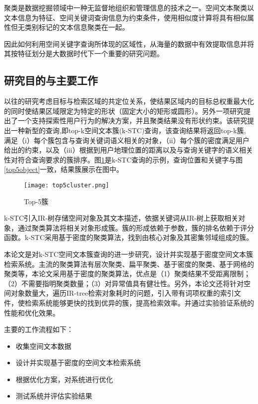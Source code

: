 聚类是数据挖掘领域中一种无监督地组织和管理信息的技术之一。空间文本聚类以文本信息为特征、空间关键词查询信息为约束条件，使用相似度计算将具有相似属性但无类别标记的文本信息聚类在一起。

因此如何利用空间关键字查询所体现的区域性，从海量的数据中有效提取信息并将其按特征划分是大数据时代下一个重要的研究问题。

\subsection{研究目的与主要工作}
以往的研究\cite{DBLP:journals/pvldb/ChoiCT12,DBLP:conf/cikm/LiuYS11,DBLP:journals/pvldb/TaoHCC13}考虑目标与检索区域的共定位关系，使结果区域内的目标总权重最大化的同时使结果区域限定为特定的形状（固定大小的矩形或圆形）。另外一项研究\cite{DBLP:conf/cikm/WuJ16}提出了一个支持探索性用户行为的解决方案，并且聚类结果没有形状约束。该研究提出一种新型的查询,即top-k空间文本簇(k-STC)查询，该查询结果将返回top-k簇, 满足（i）每个簇包含与查询关键词语义相关的对象，（ii）每个簇的密度满足用户给出的约束，以及（iii）根据到用户地理位置的距离以及与查询关键字的语义相关性对符合查询要求的簇排序。图\ref{top5cluster}是k-STC查询的示例，查询位置和关键字与图\ref{top5object}一致，结果簇展示在图中。
\begin{figure}[htbp]
	\begin{center}
		\texttt{[image: top5cluster.png]}
		\caption{Top-5簇}
		\label{top5cluster}
	\end{center}
\end{figure}

k-STC引入IR-树存储空间对象及其文本描述，依据关键词从IR-树上获取相关对象，通过聚类算法将相关对象形成簇。簇的形成依赖于参数，簇的排名依赖于评分函数。k-STC采用基于密度的聚类算法，找到由核心对象及其密集邻域组成的簇。

本论文是对k-STC空间文本簇查询的进一步研究，设计并实现基于密度空间文本簇检索系统。主流的聚类算法有层次聚类、扁平聚类、基于密度的聚类、基于网格的聚类等，本论文采用基于密度的聚类算法，优点是（1）聚类结果不受距离限制；（2）不需要指明聚类数量；（3）对异常值具有健壮性。另外，本论文还将针对空间对象数量大，遍历IR-tree检索对象耗时的问题，引入带有词项权重的索引文件，使检索系统能够更快的找到优异的簇，提高检索效率。并通过实验验证系统的性能和优化效果。

主要的工作流程如下：
\begin{itemize}
	\item 收集空间文本数据
	\item 设计并实现基于密度的空间文本检索系统
	\item 根据优化方案，对系统进行优化
	\item 测试系统并评估实验结果
\end{itemize}

